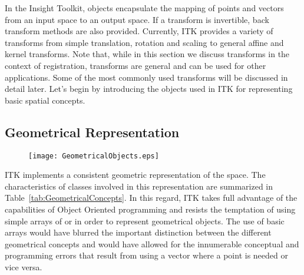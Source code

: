 
\def\tableconfiguration{ | p{3cm} | p{1.8cm} | p{2.5cm} | p{4cm} | }




In the Insight Toolkit,  objects encapsulate the mapping of
points and vectors from an input space to an output space.  If a transform is
invertible, back transform methods are also provided.  Currently, ITK provides
a variety of transforms from simple translation, rotation and scaling to
general affine and kernel transforms.  Note that, while in this section we
discuss transforms in the context of registration, transforms are general and
can be used for other applications. Some of the most commonly used transforms
will be discussed in detail later. Let's begin by introducing the objects used
in ITK for representing basic spatial concepts.


\subsection{Geometrical Representation}
\label{sec:GeometricalObjects}

\begin{figure}
\center
\texttt{[image: GeometricalObjects.eps]}
\label{fig:GeometricalObjects}
\end{figure}
 
ITK implements a consistent geometric representation of the space. The
characteristics of classes involved in this representation are summarized in
Table~\ref{tab:GeometricalConcepts}. In this regard, ITK takes full advantage
of the capabilities of Object Oriented programming and resists the temptation
of using simple arrays of  or  in order to represent
geometrical objects. The use of basic arrays would have blurred the important
distinction between the different geometrical concepts and would have allowed
for the innumerable conceptual and programming errors that result from using a
vector where a point is needed or vice versa.


